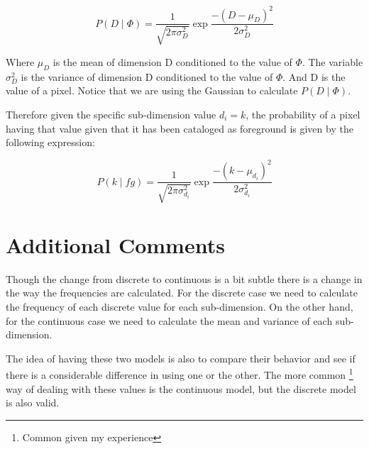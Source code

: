 \documentclass[a4paper,12pt]{report}
\begin{document}
\begin{equation}\label{eq:dimgivenphigauss}
    P(D \mid \Phi) = \frac{1}{\sqrt{2 \pi \sigma_D^2}}
                       \exp{\frac{-(D - \mu_D)^2}{2 \sigma_D^2}}
\end{equation}

Where $\mu_D$ is the mean of dimension D conditioned to the value of $\Phi$. The
variable $\sigma_D^2$ is the variance of dimension D conditioned to the value of
$\Phi$. And D is the value of a pixel. Notice that we are using the Gaussian to
calculate $P(D \mid \Phi)$.

Therefore given the specific sub-dimension value $d_i=k$, the probability of a
pixel having that value given that it has been cataloged as foreground is given
by the following expression:

\begin{equation}\label{eq:dimgivenphigauss}
    P(k \mid fg) = \frac{1}{\sqrt{2 \pi \sigma_{d_i}^2}}
                   \exp{\frac{-(k - \mu_{d_i})^2}{2 \sigma_{d_i}^2}}
\end{equation}

\section{Additional Comments}
Though the change from discrete to continuous is a bit subtle there is a change
in the way the frequencies are calculated. For the discrete case we need to
calculate the frequency of each discrete value for each sub-dimension. On the
other hand, for the continuous case we need to calculate the mean and variance
of each sub-dimension.

The idea of having these two models is also to compare their behavior and see if
there is a considerable difference in using one or the other. The more common
\footnote{Common given my experience} way of dealing with these values is the
continuous model, but the discrete model is also valid.

\listoffixmes

%
%
\end{document}
